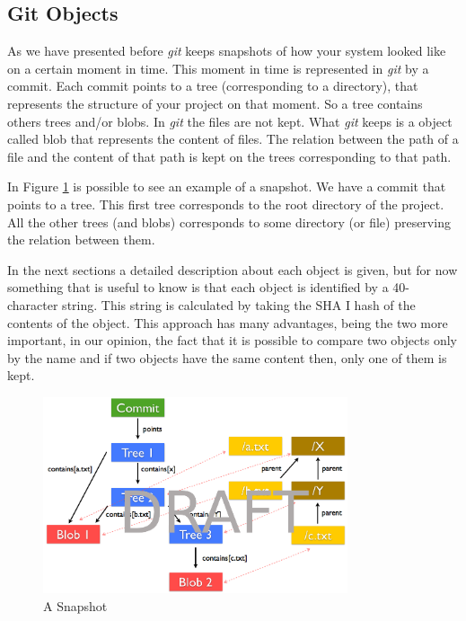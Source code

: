 \subsection{Git Objects}
As we have presented before \emph{git} keeps snapshots of how your system
looked like on a certain moment in time. This moment in time is
represented in \emph{git} by a commit. Each commit points to a tree
(corresponding to a directory), that
represents the structure of your project on that moment. So a tree
contains others trees and/or blobs. In \emph{git} the files are not kept. 
What \emph{git} keeps is a object called blob that represents the content of files. The
relation between the path of a file and the content of that path 
is kept on the trees corresponding to that path. \par
In Figure \ref{fig:snapshot} is possible to see an example of a snapshot. We
have a commit that points to a tree. This first tree corresponds to
the root directory of the project. All the other trees (and blobs)
corresponds to some directory (or file) preserving the relation
between them. \par
In the next sections a detailed description about each object is
given, but for now something that is useful to know is that each
object is identified by a 40-character string. This string is
calculated by taking the SHA I hash of the contents of the object.
This approach has many advantages, being the two more important, in our
opinion, the
fact that it is possible to compare two objects only by the name and
if two objects have the same content then, only one of them is kept.\par

\begin{figure}[!t]
   \centering
   \includegraphics[width=0.8\textwidth]{images/snapshot.png}
   \caption{A Snapshot}
   \label{fig:snapshot}
\end{figure}

